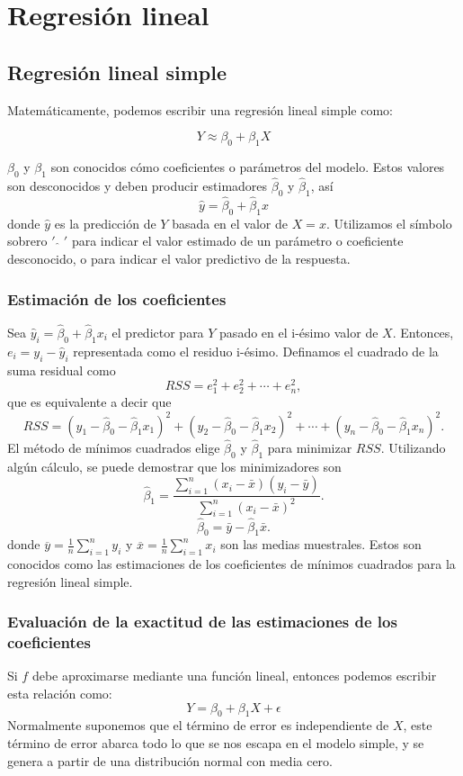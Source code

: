 \chapter{Regresión lineal}

\section{Regresión lineal simple}

Matemáticamente, podemos escribir una regresión lineal simple como:

$$Y \approx \beta_0 + \beta_1 X$$

$\beta_0$ y $\beta_1$ son conocidos cómo coeficientes o parámetros del modelo. Estos valores son desconocidos y deben producir estimadores $\hat{\beta}_0$ y $\hat{\beta}_1$, así
$$\hat{y} = \hat{\beta}_0 + \hat{\beta}_1 x$$
donde $\hat{y}$ es la predicción de $Y$ basada en el valor de $X=x$. Utilizamos el símbolo sobrero $'$ $\hat{}$ $'$ para indicar el valor estimado de un parámetro o coeficiente desconocido, o para indicar el valor predictivo de la respuesta.  

\subsection{Estimación de los coeficientes}
Sea $\hat{y}_i=\hat{\beta}_0+\hat{\beta}_1x_i$ el predictor para $Y$ pasado en el i-ésimo valor de $X$. Entonces, $e_i=y_i-\hat{y}_i$ representada como el residuo i-ésimo. Definamos el cuadrado de la suma residual como
$$RSS=e_1^2+e_2^2+\cdots+e_n^2,$$
que es equivalente a decir que
$$RSS=\left(y_1-\hat{\beta}_0-\hat{\beta}_1x_1\right)^2+\left(y_2-\hat{\beta}_0-\hat{\beta}_1x_2\right)^2+\cdots+\left(y_n-\hat{\beta}_0-\hat{\beta}_1x_n\right)^2.$$
El método de mínimos cuadrados elige $\hat{\beta}_0$ y $\hat{\beta}_1$ para minimizar $RSS$. Utilizando algún cálculo, se puede demostrar que los minimizadores son
$$\hat{\beta}_1 = \dfrac{\sum_{i=1}^{n}\left(x_i-\bar{x}\right)\left(y_i-\bar{y}\right)}{\sum_{i=1}^{n}\left(x_i-\bar{x}\right)^2}.$$
$$\hat{\beta}_0=\bar{y}-\hat{\beta}_1\bar{x}.$$
donde $\overline{y}=\frac{1}{n}\sum_{i=1}^n y_i$ y $\overline{x}=\frac{1}{n}\sum_{i=1}^n x_i$ son las medias muestrales. Estos son conocidos como las estimaciones de los coeficientes de mínimos cuadrados para la regresión lineal simple.


\subsection{Evaluación de la exactitud de las estimaciones de los coeficientes}
Si $f$ debe aproximarse mediante una función lineal, entonces podemos escribir esta relación como:
$$Y=\beta_0+\beta_1 X+\epsilon$$
Normalmente suponemos que el término de error es independiente de $X$, este término de error abarca todo lo que se nos escapa en el modelo simple, y se genera a partir de una distribución normal con media cero.\\

